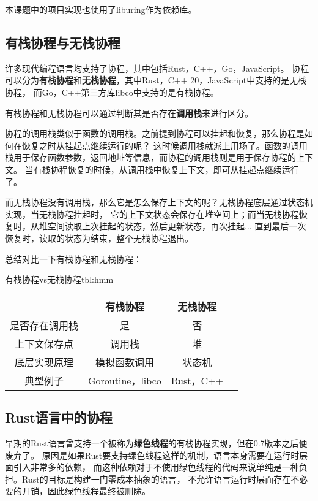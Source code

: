 \documentclass[supercite]{HustGraduPaper}
\theoremstyle{definition}
\begin{document}
本课题中的项目实现也使用了liburing作为依赖库。\par

\subsection{有栈协程与无栈协程}
许多现代编程语言均支持了协程，其中包括Rust，C++，Go，JavaScript。
协程可以分为\textbf{有栈协程}和\textbf{无栈协程}，其中Rust，C++ 20，JavaScript中支持的是无栈协程，
而Go，C++第三方库libco中支持的是有栈协程。\par

有栈协程和无栈协程可以通过判断其是否存在\textbf{调用栈}来进行区分。\par

协程的调用栈类似于函数的调用栈。之前提到协程可以挂起和恢复，那么协程是如何在恢复之时从挂起点继续运行的呢？
这时候调用栈就派上用场了。函数的调用栈用于保存函数参数，返回地址等信息，而协程的调用栈则是用于保存协程的上下文。
当有栈协程恢复的时候，从调用栈中恢复上下文，即可从挂起点继续运行了。\par

而无栈协程没有调用栈，那么它是怎么保存上下文的呢？无栈协程底层通过状态机实现，当无栈协程挂起时，
它的上下文状态会保存在堆空间上；而当无栈协程恢复时，从堆空间读取上次挂起的状态，然后更新状态，再次挂起...
直到最后一次恢复时，读取的状态为结束，整个无栈协程退出。\par

总结对比一下有栈协程和无栈协程：

\begin{generaltab}{有栈协程vs无栈协程}{tbl:hmm}
  \begin{tabular}{c|ccc}
    \toprule
    -- & 有栈协程 & 无栈协程 \\
    \midrule
    是否存在调用栈 & 是 & 否 \\
    上下文保存点 & 调用栈 & 堆 \\
    底层实现原理 & 模拟函数调用 & 状态机 \\
    典型例子 & Goroutine，libco & Rust，C++ \\
    \bottomrule
  \end{tabular}
\end{generaltab}

\subsection{Rust语言中的协程}
早期的Rust语言曾支持一个被称为\textbf{绿色线程}的有栈协程实现，但在0.7版本之后便废弃了。
原因是如果Rust要支持绿色线程这样的机制，语言本身需要在运行时层面引入非常多的依赖，
而这种依赖对于不使用绿色线程的代码来说单纯是一种负担。Rust的目标是构建一门零成本抽象的语言，
不允许语言运行时层面存在不必要的开销，因此绿色线程最终被删除。\par
\end{document}
